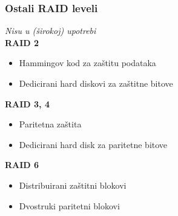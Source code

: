 \documentclass[t]{beamer}
\begin{document}
\begin{frame}
	\frametitle{Ostali RAID leveli}
	\emph{Nisu u (širokoj) upotrebi}\\
	\vfill
	\textbf{RAID 2}
	\begin{itemize}
		\item Hammingov kod za zaštitu podataka
		\item Dedicirani hard diskovi za zaštitne bitove
	\end{itemize}
	\vfill
	\textbf{RAID 3, 4}
	\begin{itemize}
		\item Paritetna zaštita
		\item Dedicirani hard disk za paritetne bitove
	\end{itemize}
	\vfill
	\textbf{RAID 6}
	\begin{itemize}
		\item Distribuirani zaštitni blokovi
		\item Dvostruki paritetni blokovi
	\end{itemize}
\end{frame}
\end{document}
